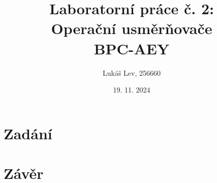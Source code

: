 \documentclass[a4paper]{article}
\title{\textbf{Laboratorní práce č. 2:}\\Operační usměrňovače\\[10pt]BPC-AEY}
\author{Lukáš Lev, 256660}
\date{19. 11. 2024}
\begin{document}
\maketitle
\newpage

\section{Zadání} \label{sec:zadani}
    

\clearpage
\section{Závěr}
    
\end{document}

